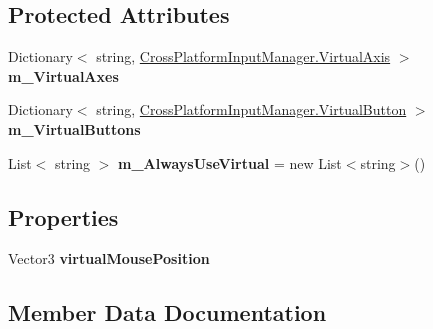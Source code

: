 \subsection*{Protected Attributes}
\begin{DoxyCompactItemize}
\item 
Dictionary$<$ string, \hyperlink{class_unity_standard_assets_1_1_cross_platform_input_1_1_cross_platform_input_manager_1_1_virtual_axis}{Cross\+Platform\+Input\+Manager.\+Virtual\+Axis} $>$ {\bfseries m\+\_\+\+Virtual\+Axes}
\item 
Dictionary$<$ string, \hyperlink{class_unity_standard_assets_1_1_cross_platform_input_1_1_cross_platform_input_manager_1_1_virtual_button}{Cross\+Platform\+Input\+Manager.\+Virtual\+Button} $>$ {\bfseries m\+\_\+\+Virtual\+Buttons}
\item 
List$<$ string $>$ {\bfseries m\+\_\+\+Always\+Use\+Virtual} = new List$<$string$>$()\hypertarget{class_unity_standard_assets_1_1_cross_platform_input_1_1_virtual_input_abe7ea4edf0c3003a5a19969530cd855e}{}\label{class_unity_standard_assets_1_1_cross_platform_input_1_1_virtual_input_abe7ea4edf0c3003a5a19969530cd855e}

\end{DoxyCompactItemize}
\subsection*{Properties}
\begin{DoxyCompactItemize}
\item 
Vector3 {\bfseries virtual\+Mouse\+Position}\hypertarget{class_unity_standard_assets_1_1_cross_platform_input_1_1_virtual_input_afa1db3ff31769359a2ba5de88d860e45}{}\label{class_unity_standard_assets_1_1_cross_platform_input_1_1_virtual_input_afa1db3ff31769359a2ba5de88d860e45}

\end{DoxyCompactItemize}


\subsection{Member Data Documentation}
